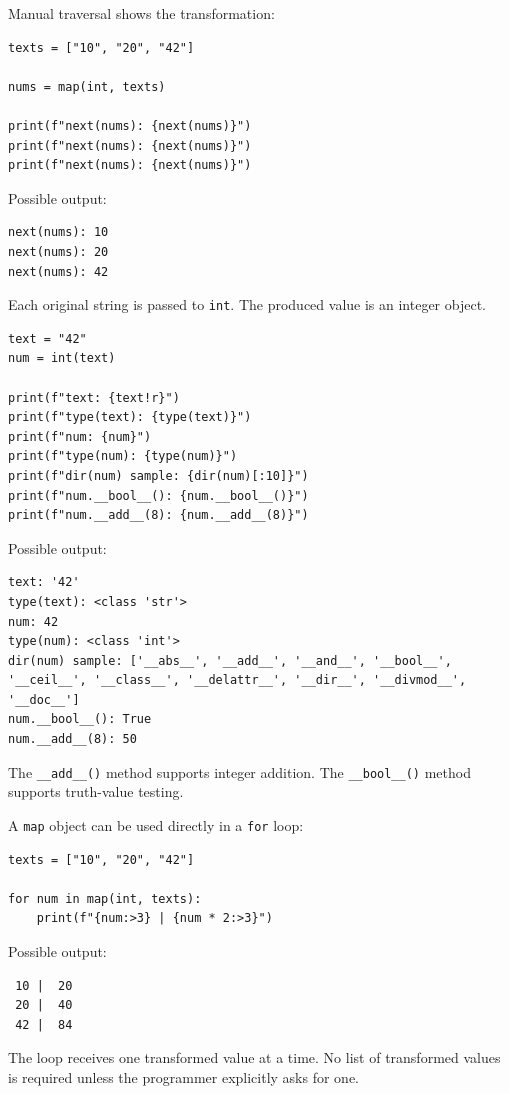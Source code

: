 \documentclass[a4paper,twoside]{report}
\begin{document}
Manual traversal shows the transformation:

\begin{verbatim}
texts = ["10", "20", "42"]

nums = map(int, texts)

print(f"next(nums): {next(nums)}")
print(f"next(nums): {next(nums)}")
print(f"next(nums): {next(nums)}")
\end{verbatim}

Possible output:

\begin{verbatim}
next(nums): 10
next(nums): 20
next(nums): 42
\end{verbatim}

Each original string is passed to \texttt{int}. The produced value is an integer object.

\begin{verbatim}
text = "42"
num = int(text)

print(f"text: {text!r}")
print(f"type(text): {type(text)}")
print(f"num: {num}")
print(f"type(num): {type(num)}")
print(f"dir(num) sample: {dir(num)[:10]}")
print(f"num.__bool__(): {num.__bool__()}")
print(f"num.__add__(8): {num.__add__(8)}")
\end{verbatim}

Possible output:

\begin{verbatim}
text: '42'
type(text): <class 'str'>
num: 42
type(num): <class 'int'>
dir(num) sample: ['__abs__', '__add__', '__and__', '__bool__',
'__ceil__', '__class__', '__delattr__', '__dir__', '__divmod__',
'__doc__']
num.__bool__(): True
num.__add__(8): 50
\end{verbatim}

The \texttt{\_\_add\_\_()} method supports integer addition. The \texttt{\_\_bool\_\_()} method supports truth-value testing.

A \texttt{map} object can be used directly in a \texttt{for} loop:

\begin{verbatim}
texts = ["10", "20", "42"]

for num in map(int, texts):
    print(f"{num:>3} | {num * 2:>3}")
\end{verbatim}

Possible output:

\begin{verbatim}
 10 |  20
 20 |  40
 42 |  84
\end{verbatim}

The loop receives one transformed value at a time. No list of transformed values is required unless the programmer explicitly asks for one.
\end{document}
